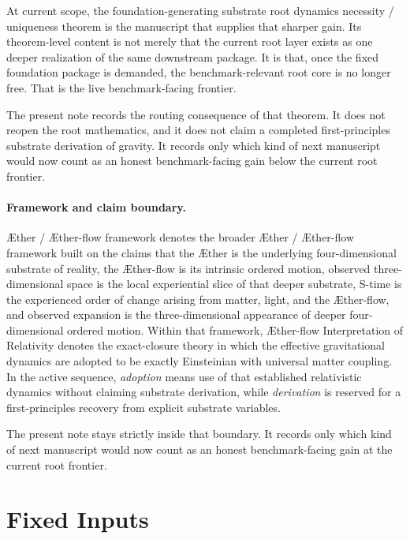 \documentclass[11pt]{article}
\newcommand{\Aether}{\AE{}ther}
\newcommand{\Aflow}{\AE{}ther-flow}
\newcommand{\TheoryName}{\Aflow{} Interpretation of Relativity}
\newcommand{\TheoryProgram}{\Aether{} / \Aflow{} framework}
\begin{document}
At current scope, the foundation-generating substrate root dynamics necessity / uniqueness theorem is the manuscript that supplies that sharper gain. Its theorem-level content is not merely that the current root layer exists as one deeper realization of the same downstream package. It is that, once the fixed foundation package is demanded, the benchmark-relevant root core is no longer free. That is the live benchmark-facing frontier.

The present note records the routing consequence of that theorem. It does not reopen the root mathematics, and it does not claim a completed first-principles substrate derivation of gravity. It records only which kind of next manuscript would now count as an honest benchmark-facing gain below the current root frontier.

\paragraph{Framework and claim boundary.}
\TheoryProgram{} denotes the broader \Aether{} / \Aflow{} framework built on the claims that the \Aether{} is the underlying four-dimensional substrate of reality, the \Aflow{} is its intrinsic ordered motion, observed three-dimensional space is the local experiential slice of that deeper substrate, S-time is the experienced order of change arising from matter, light, and the \Aflow{}, and observed expansion is the three-dimensional appearance of deeper four-dimensional ordered motion. Within that framework, \TheoryName{} denotes the exact-closure theory in which the effective gravitational dynamics are adopted to be exactly Einsteinian with universal matter coupling. In the active sequence, \emph{adoption} means use of that established relativistic dynamics without claiming substrate derivation, while \emph{derivation} is reserved for a first-principles recovery from explicit substrate variables.

The present note stays strictly inside that boundary. It records only which kind of next manuscript would now count as an honest benchmark-facing gain at the current root frontier.

\section{Fixed Inputs}
\end{document}
